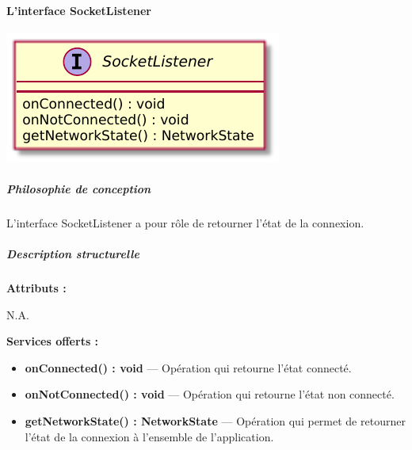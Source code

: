 \paragraph{L'interface SocketListener}


\begin{minipage}
    {\linewidth}
    \centering
    \includegraphics[width=0.30\linewidth]{../schemas/Conception_detaillee/interface_SocketListener.pdf}
\end{minipage}
\subparagraph{Philosophie de conception \newline} 

\medspace

L'interface SocketListener a pour rôle de retourner l'état de la connexion. 

\subparagraph{Description structurelle \newline}

\medspace

\textbf{Attributs :}

N.A.

\textbf{Services offerts :}

\begin{itemize}
    \item \textbf{onConnected() : void} --- Opération qui retourne l'état connecté. 
    \item \textbf{onNotConnected() : void } --- Opération qui retourne l'état non connecté.
    \item \textbf{getNetworkState() : NetworkState } --- Opération qui permet de retourner l'état de la connexion à l'ensemble de l'application. 
\end{itemize}

